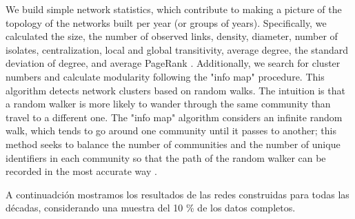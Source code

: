 \begin{enumerate}
We build simple network statistics, which contribute to making a picture of the topology of the networks built per year (or groups of years). Specifically, we calculated the size, the number of observed links, density, diameter, number of isolates, centralization, local and global transitivity, average degree, the standard deviation of degree, and average PageRank \parencite{brin_anatomy_1998}. Additionally, we search for cluster numbers and calculate modularity following the "info map" procedure. This algorithm detects network clusters based on random walks. The intuition is that a random walker is more likely to wander through the same community than travel to a different one. The "info map" algorithm considers an infinite random walk, which tends to go around one community until it passes to another; this method seeks to balance the number of communities and the number of unique identifiers in each community so that the path of the random walker can be recorded in the most accurate way \parencite{rosvall_maps_2008}. 
  
A continuadción mostramos los resultados de las redes construidas para todas las décadas, considerando una muestra del 10 \% de los datos completos. 
 \bigskip



\end{enumerate}
